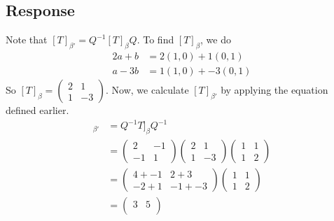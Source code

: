 \documentclass[13pt]{article}
\begin{document}
        \subsection*{Response}
        Note that $[T]_{\beta'} = Q^{-1}[T]_{\beta}Q$. To find $[T]_{\beta}$, we do
        \begin{align*}
          2a + b &= 2(1, 0) + 1(0, 1) \\
          a - 3b &= 1(1, 0) + -3(0, 1)
        \end{align*}
        So $[T]_{\beta} =
        \begin{pmatrix}
          2 & 1 \\
          1 & -3
        \end{pmatrix}$. Now, we calculate $[T]_{\beta'}$ by applying the equation defined earlier.
        \begin{align*}
          [T]_{\beta'} &= Q^{-1}T]_{\beta}Q^{-1} \\
                       &= \begin{pmatrix}
                            2 & -1 \\
                            -1 & 1
                          \end{pmatrix}
                         \begin{pmatrix}
                           2 & 1 \\
                           1 & -3
                         \end{pmatrix}
                         \begin{pmatrix}
                           1 & 1 \\
                           1 & 2
                         \end{pmatrix} \\
                       &=
                         \begin{pmatrix}
                           4 + -1 & 2 + 3 \\
                           -2 + 1 & -1 + -3      
                         \end{pmatrix}
                         \begin{pmatrix}
                           1 & 1 \\
                           1 & 2
                         \end{pmatrix} \\
                       &=
                         \begin{pmatrix}
                           3 & 5 \\

\end{pmatrix}
\end{align*}
\end{document}
